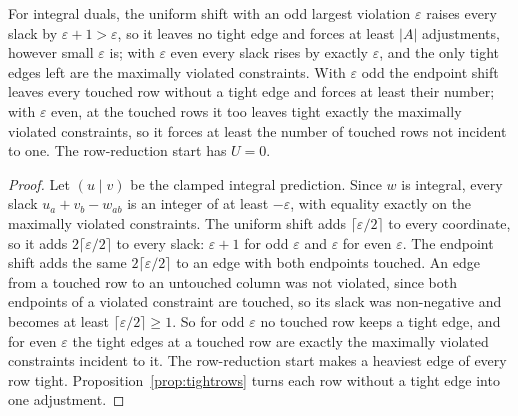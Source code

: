 \begin{corollary}\label{cor:shiftrows}
For integral duals, the uniform shift with an odd largest violation $\varepsilon$ raises every
slack by $\varepsilon + 1 > \varepsilon$, so it leaves no tight edge and forces at least $|A|$
adjustments, however small $\varepsilon$ is; with $\varepsilon$ even every slack rises by exactly
$\varepsilon$, and the only tight edges left are the maximally violated constraints. With $\varepsilon$ odd the endpoint shift leaves every touched row without a tight edge and forces at least their number; with $\varepsilon$ even, at the touched rows it too leaves tight exactly the maximally violated constraints, so it forces at least the number of touched rows not incident to one. The row-reduction start has $U = 0$.
\end{corollary}
\begin{proof}
Let $(u \mid v)$ be the clamped integral prediction. Since $w$ is integral, every slack
$u_a + v_b - w_{ab}$ is an integer of at least $-\varepsilon$, with equality exactly on the
maximally violated constraints. The uniform shift adds $\lceil\varepsilon/2\rceil$ to every
coordinate, so it adds $2\lceil\varepsilon/2\rceil$ to every slack: $\varepsilon + 1$ for odd
$\varepsilon$ and $\varepsilon$ for even $\varepsilon$. The endpoint shift adds the same
$2\lceil\varepsilon/2\rceil$ to an edge with both endpoints touched. An edge from a touched row to
an untouched column was not violated, since both endpoints of a violated constraint are touched, so
its slack was non-negative and becomes at least $\lceil\varepsilon/2\rceil \ge 1$. So for odd
$\varepsilon$ no touched row keeps a tight edge, and for even $\varepsilon$ the tight edges at a
touched row are exactly the maximally violated constraints incident to it. The row-reduction start
makes a heaviest edge of every row tight. Proposition~\ref{prop:tightrows} turns each row without a
tight edge into one adjustment.
\end{proof}

